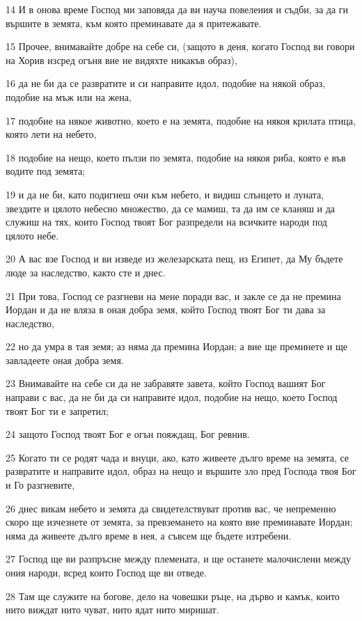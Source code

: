 \par 14 И в онова време Господ ми заповяда да ви науча повеления и съдби, за да ги вършите в земята, към която преминавате да я притежавате.
\par 15 Прочее, внимавайте добре на себе си, (защото в деня, когато Господ ви говори на Хорив изсред огъня вие не видяхте никакъв образ),
\par 16 да не би да се развратите и си направите идол, подобие на някой образ, подобие на мъж или на жена,
\par 17 подобие на някое животно, което е на земята, подобие на някоя крилата птица, която лети на небето,
\par 18 подобие на нещо, което пълзи по земята, подобие на някоя риба, която е във водите под земята;
\par 19 и да не би, като подигнеш очи към небето, и видиш слънцето и луната, звездите и цялото небесно множество, да се мамиш, та да им се кланяш и да служиш на тях, които Господ твоят Бог разпредели на всичките народи под цялото небе.
\par 20 А вас взе Господ и ви изведе из железарската пещ, из Египет, да Му бъдете люде за наследство, както сте и днес.
\par 21 При това, Господ се разгневи на мене поради вас, и закле се да не премина Иордан и да не вляза в оная добра земя, който Господ твоят Бог ти дава за наследство,
\par 22 но да умра в тая земя; аз няма да премина Иордан; а вие ще преминете и ще завладеете оная добра земя.
\par 23 Внимавайте на себе си да не забравяте завета, който Господ вашият Бог направи с вас, да не би да си направите идол, подобие на нещо, което Господ твоят Бог ти е запретил;
\par 24 защото Господ твоят Бог е огън пояждащ, Бог ревнив.
\par 25 Когато ти се родят чада и внуци, ако, като живеете дълго време на земята, се развратите и направите идол, образ на нещо и вършите зло пред Господа твоя Бог и Го разгневите,
\par 26 днес викам небето и земята да свидетелствуват против вас, че непременно скоро ще изчезнете от земята, за превземането на която вие преминавате Иордан; няма да живеете дълго време в нея, а съвсем ще бъдете изтребени.
\par 27 Господ ще ви разпръсне между племената, и ще останете малочислени между ония народи, всред които Господ ще ви отведе.
\par 28 Там ще служите на богове, дело на човешки ръце, на дърво и камък, които нито виждат нито чуват, нито ядат нито миришат.
